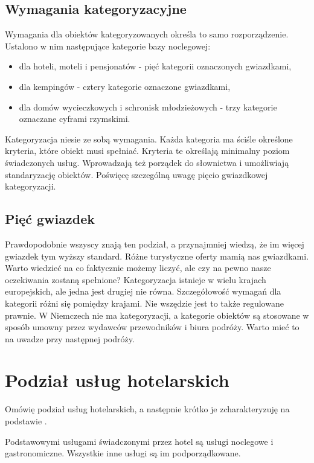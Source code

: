 \documentclass[a4paper,onecolumn,oneside,11pt,wide,floatssmall]{mwrep}
\theoremstyle{definition}
\theoremstyle{plain}%
\theoremstyle{remark}
\begin{document}
\subsection{Wymagania kategoryzacyjne}
Wymagania dla obiektów kategoryzowanych określa to samo rozporządzenie. 
Ustalono w nim następujące kategorie bazy noclegowej:

\begin{itemize}
  \item dla hoteli, moteli i pensjonatów - pięć kategorii oznaczonych 
  gwiazdkami,
  \item dla kempingów - cztery kategorie oznaczone gwiazdkami,
  \item dla domów wycieczkowych i schronisk młodzieżowych - trzy kategorie 
  oznaczane cyframi rzymskimi.
\end{itemize}

Kategoryzacja niesie ze sobą wymagania. Każda kategoria ma ściśle określone 
kryteria, które obiekt musi spełniać. Kryteria te określają minimalny poziom 
świadczonych usług. Wprowadzają też porządek do słownictwa i umożliwiają 
standaryzację obiektów. Poświęcę szczególną uwagę pięcio gwiazdkowej 
kategoryzacji.

\subsection{Pięć gwiazdek}
Prawdopodobnie wszyscy znają ten podział, a przynajmniej wiedzą, że im 
więcej gwiazdek tym wyższy standard. Różne turystyczne oferty mamią nas 
gwiazdkami. Warto wiedzieć na co faktycznie możemy liczyć, ale czy na pewno 
nasze oczekiwania zostaną spełnione? Kategoryzacja istnieje w wielu krajach 
europejskich, ale jedna jest drugiej nie równa. Szczegółowość wymagań dla 
kategorii różni się pomiędzy krajami. Nie wszędzie jest to także regulowane 
prawnie. W Niemczech nie ma kategoryzacji, a kategorie obiektów są stosowane 
w sposób umowny przez wydawców przewodników i biura podróży. Warto mieć to 
na uwadze przy następnej podróży.

\section{Podział usług hotelarskich}   
Omówię podział usług hotelarskich, a następnie krótko je zcharakteryzuję na 
podstawie \cite[8-10]{OrgaDzialHot}.

Podstawowymi usługami świadczonymi przez hotel są usługi noclegowe i 
gastronomiczne. Wszystkie inne usługi są im podporządkowane.
\end{document}
